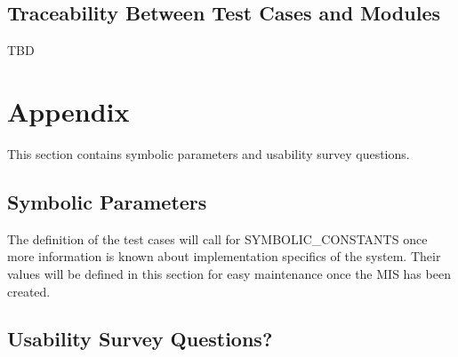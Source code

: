 \documentclass[12pt, titlepage]{article}
\begin{document}
					
					
					
					




\subsection{Traceability Between Test Cases and Modules}
TBD

				



\newpage

\section{Appendix}

This section contains symbolic parameters and usability survey questions.

\subsection{Symbolic Parameters}

The definition of the test cases will call for SYMBOLIC\_CONSTANTS once more information is known about implementation specifics of the system.
Their values will be defined in this section for easy maintenance once the MIS has been created.

\subsection{Usability Survey Questions?}
\end{document}
